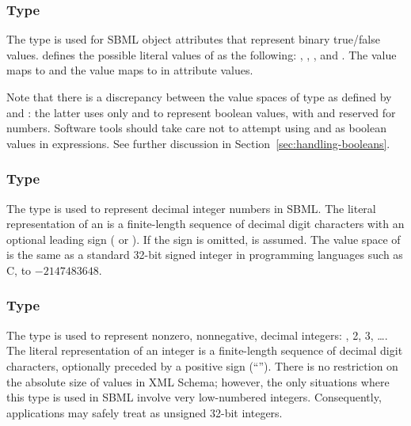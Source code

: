 \subsubsection{Type }
\label{sec:boolean}

The \xmlschemaone type  is used for SBML object
attributes that represent binary true/false values.  \xmlschemaone
defines the possible literal values of  as the
following: , , , and .  The
value  maps to  and the value  maps to
 in attribute values.

Note that there is a discrepancy between the value spaces of type
 as defined by \xmlschemaone and \mathml: the
latter uses only  and  to represent boolean
values, with  and  reserved for numbers.  Software
tools should take care not to attempt using  and  as
boolean values in \mathml expressions.  See further discussion in
Section~\ref{sec:handling-booleans}.


\subsubsection{Type }
\label{sec:integer}

The \xmlschemaone type  is used to represent decimal
integer numbers in SBML.  The literal representation of an
 is a finite-length sequence of decimal digit
characters with an optional leading sign (\val{+} or \val{-}).  If
the sign is omitted, \val{+} is assumed.  The value space of
 is the same as a standard 32-bit signed integer in
programming languages such as C,  to $-2147483648$.


\subsubsection{Type }
\label{sec:positiveinteger}

The \xmlschemaone type  is used to
represent nonzero, nonnegative, decimal integers: , 2, 3,
\ldots.  The literal representation of an integer is a
finite-length sequence of decimal digit characters, optionally
preceded by a positive sign (``\token{+}'').  There is no
restriction on the absolute size of 
values in XML Schema; however, the only situations where this type
is used in SBML involve very low-numbered integers.  Consequently,
applications may safely treat  as
unsigned 32-bit integers.


